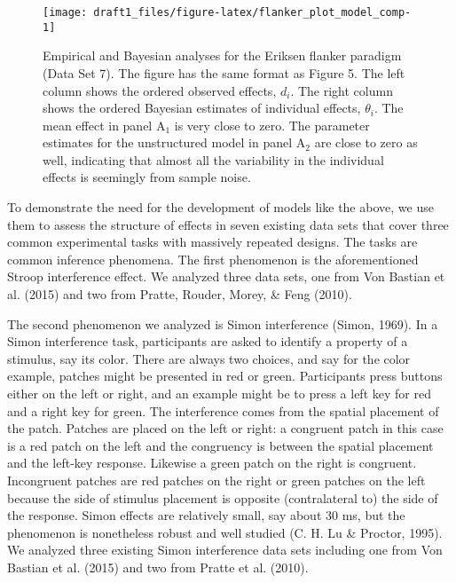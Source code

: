 \documentclass[american,man]{apa6}
\begin{document}
\begin{figure}

{\centering \texttt{[image: draft1\_files/figure-latex/flanker\_plot\_model\_comp-1]} 

}

\caption{{\footnotesize Empirical and Bayesian analyses for the Eriksen flanker paradigm (Data Set 7). The figure has the same format as Figure 5. The left column shows the ordered observed effects, $d_i$. The right column shows the ordered Bayesian estimates of individual effects, $\theta_i$. The mean effect in panel $\mbox{A}_1$ is very close to zero. The parameter estimates for the unstructured model in panel $\mbox{A}_2$ are close to zero as well, indicating that almost all the variability in the individual effects is seemingly from sample noise.}}\label{fig:flanker_plot_model_comp}
\end{figure}

To demonstrate the need for the development of models like the above, we
use them to assess the structure of effects in seven existing data sets
that cover three common experimental tasks with massively repeated
designs. The tasks are common inference phenomena. The first phenomenon
is the aforementioned Stroop interference effect. We analyzed three data
sets, one from Von Bastian et al. (2015) and two from Pratte, Rouder,
Morey, \& Feng (2010).

The second phenomenon we analyzed is Simon interference (Simon, 1969).
In a Simon interference task, participants are asked to identify a
property of a stimulus, say its color. There are always two choices, and
say for the color example, patches might be presented in red or green.
Participants press buttons either on the left or right, and an example
might be to press a left key for red and a right key for green. The
interference comes from the spatial placement of the patch. Patches are
placed on the left or right: a congruent patch in this case is a red
patch on the left and the congruency is between the spatial placement
and the left-key response. Likewise a green patch on the right is
congruent. Incongruent patches are red patches on the right or green
patches on the left because the side of stimulus placement is opposite
(contralateral to) the side of the response. Simon effects are
relatively small, say about 30 ms, but the phenomenon is nonetheless
robust and well studied (C. H. Lu \& Proctor, 1995). We analyzed three
existing Simon interference data sets including one from Von Bastian et
al. (2015) and two from Pratte et al. (2010).
\end{document}
